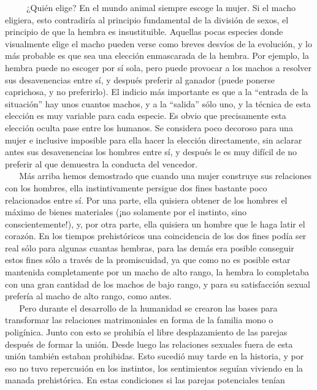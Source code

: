 ~ ~ ~ ¿Quién elige? En el mundo animal siempre escoge la mujer. Si el
macho eligiera, esto contradiría al principio fundamental de la división
de sexos, el principio de que la hembra es insustituible. Aquellas pocas
especies donde visualmente elige el macho pueden verse como breves
desvíos de la evolución, y lo más probable es que sea una elección
enmascarada de la hembra. Por ejemplo, la hembra puede no escoger por sí
sola, pero puede provocar a los machos a resolver sus desavenencias
entre sí, y después preferir al ganador (puede ponerse caprichosa, y no
preferirlo). El indicio más importante es que a la ``entrada de la
situación'' hay unos cuantos machos, y a la ``salida'' sólo uno, y la
técnica de esta elección es muy variable para cada especie. Es obvio que
precisamente esta elección oculta pase entre los humanos. Se considera
poco decoroso para una mujer e inclusive imposible para ella hacer la
elección directamente, sin aclarar antes sus desavenencias los hombres
entre sí, y después le es muy difícil de no preferir al que demuestra la
conducta del vencedor.\\
\hspace*{0.333em} ~ ~ Más arriba hemos demostrado que cuando una mujer
construye sus relaciones con los hombres, ella instintivamente persigue
dos fines bastante poco relacionados entre sí. Por una parte, ella
quisiera obtener de los hombres el máximo de bienes materiales (¡no
solamente por el instinto, sino conscientemente!), y, por otra parte,
ella quisiera un hombre que le haga latir el corazón. En los tiempos
prehistóricos una coincidencia de los dos fines podía ser real sólo para
algunas cuantas hembras, para las demás era posible conseguir estos
fines sólo a través de la promiscuidad, ya que como no es posible estar
mantenida completamente por un macho de alto rango, la hembra lo
completaba con una gran cantidad de los machos de bajo rango, y para su
satisfacción sexual prefería al macho de alto rango, como antes.\\
\hspace*{0.333em} ~ ~ Pero durante el desarrollo de la humanidad se
crearon las bases para transformar las relaciones matrimoniales en forma
de la familia mono o poligínica. Junto con esto se prohibía el libre
desplazamiento de las parejas después de formar la unión. Desde luego
las relaciones sexuales fuera de esta unión también estaban prohibidas.
Esto sucedió muy tarde en la historia, y por eso no tuvo repercusión en
los instintos, los sentimientos seguían viviendo en la manada
prehistórica. En estas condiciones si las parejas potenciales tenían
